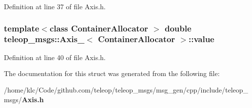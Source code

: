 Definition at line 37 of file Axis.h.

\subsubsection[{value}]{\setlength{\rightskip}{0pt plus 5cm}template$<$class ContainerAllocator $>$ double {\bf teleop\_\-msgs::Axis\_\-}$<$ ContainerAllocator $>$::{\bf value}}\label{structteleop__msgs_1_1Axis___a9196387fde565d8e9bc7a68cef2934b2}


Definition at line 40 of file Axis.h.



The documentation for this struct was generated from the following file:\begin{DoxyCompactItemize}
\item 
/home/klc/Code/github.com/teleop/teleop\_\-msgs/msg\_\-gen/cpp/include/teleop\_\-msgs/{\bf Axis.h}\end{DoxyCompactItemize}
